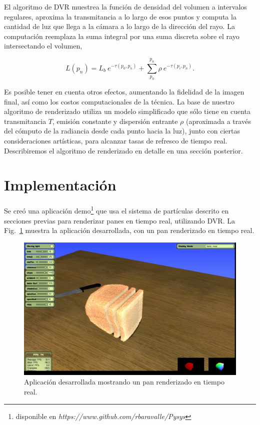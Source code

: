 El algoritmo de DVR muestrea la función de densidad del volumen a intervalos regulares, aproxima la transmitancia a lo largo de esos puntos y computa la cantidad de luz que llega a la cámara a lo largo de la dirección del rayo.
La computación reemplaza la suma integral por una suma discreta sobre el rayo intersectando el volumen,

\begin{equation} \label{eq:ray_radiance}  
  L(p_n) = L_b \ e^{-\tau(p_0, p_n)} + \sum_{p_0}^{p_n} \rho \ e^{-\tau(p_i,p_n)}.
\end{equation}

Es posible tener en cuenta otros efectos, aumentando la fidelidad de la imagen final, así como los costos computacionales de la técnica.
La base de nuestro algoritmo de renderizado utiliza un modelo simplificado que sólo tiene en cuenta transmitancia $T$, emisión constante y dispersión entrante $\rho$ (aproximada a través del cómputo de la radiancia desde cada punto hacia la luz), junto con ciertas consideraciones artísticas, para alcanzar tasas de refresco de tiempo real.
Describiremos el algoritmo de renderizado en detalle en una sección posterior.

\section{Implementación}

Se creó una aplicación demo\footnote{disponible en \emph{https://www.github.com/rbaravalle/Pysys}}  que usa el sistema de partículas descrito en secciones previas para renderizar panes en tiempo real, utilizando DVR.
La Fig.~\ref{fg:application} muestra la aplicación desarrollada, con un pan renderizado en tiempo real.


\begin{figure}
\centerline{\includegraphics[width=13cm]{figures/application}}
\caption{Aplicación desarrollada mostrando un pan renderizado en tiempo real.}
\label{fg:application}
\end{figure}


